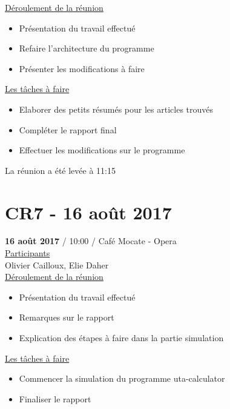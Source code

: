 \documentclass{report}
\begin{document}
\begin{appendices}
\underline{Déroulement de la réunion}\\
\begin{itemize}
	\item Présentation du travail effectué
	\item Refaire l’architecture du programme
	\item Présenter les modifications à faire\\
\end{itemize}

\underline{Les tâches à faire} \\
\begin{itemize}
	\item Elaborer des petits résumés pour les articles trouvés
	\item Compléter le rapport final
	\item Effectuer les modifications sur le programme\\
\end{itemize}

La réunion a été levée à 11:15\\

\newpage
\section{CR7 - 16 août 2017}
\textbf{16 août 2017} / 10:00 / Café Mocate - Opera \\

\underline{Participants} \\

Olivier Cailloux, Elie Daher\\

\underline{Déroulement de la réunion} \\
\begin{itemize}
	\item Présentation du travail effectué
	\item Remarques sur le rapport
	\item Explication des étapes à faire dans la partie simulation\\
\end{itemize}

\underline{Les tâches à faire} \\
\begin{itemize}
	\item Commencer la simulation du programme uta-calculator
	\item Finaliser le rapport\\
\end{itemize}


\end{appendices}
\end{document}

